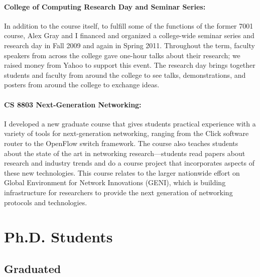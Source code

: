 \documentclass{article}
\begin{document}
\begin{cv}{}
\paragraph{College of Computing Research Day and Seminar Series:}
In addition to the course itself, to fulfill some of the functions of
the former 7001 course, Alex Gray and I financed and organized a
college-wide seminar series and research day in Fall 2009 and again in
Spring 2011.  Throughout the term, faculty speakers from across the
college gave one-hour talks about their research; we raised money from
Yahoo to support this event.  The research day brings together students
and faculty from around the college to see talks, demonstrations, and
posters from around the college to exchange ideas.

\paragraph{CS 8803 Next-Generation Networking:} I developed a
new graduate course that gives students practical experience with
a variety of tools for next-generation networking, ranging from the
Click software router to the OpenFlow switch framework.  The course also
teaches students about the state of the art in networking
research---students read papers about research and industry trends and
do a course project that incorporates aspects of these new
technologies.  This course relates to the larger nationwide effort on
Global Environment for Network Innovations (GENI), which is building
infrastructure for researchers to provide the next generation of
networking protocols and technologies.



\section*{Ph.D. Students}

\def\student#1#2#3#4#5{\item {\bf #1}. {#2 ~
{\sl #3}. \\
Publications: #4 \\
{\sl #5}}}

\def\studentnopub#1#2#3#4#5{\item {\bf #1}. {#2 ~
{\sl #3} 
{\sl #5}
}}



\subsection*{Graduated}


\end{cv}
\end{document}
